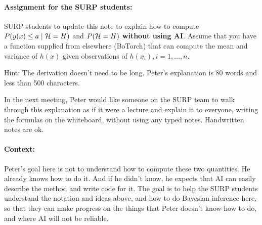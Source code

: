 \paragraph{Assignment for the SURP students:}
SURP students to update this note to explain how to compute $P(y(x) \le a \mid
\mathcal{H} = H)$ and $P(\mathcal{H} = H)$ {\bf without using AI}.  Assume that you have a
function supplied from elsewhere (BoTorch) that can compute the mean and
variance of $h(x)$ given observations of $h(x_i), i=1,\ldots,n$.

Hint: The derivation doesn't need to be long.  Peter's explanation is 80 words
and less than 500 characters.

In the next meeting, Peter would like someone on the SURP team to walk through
this explanation as if it were a lecture and explain it to everyone, writing
the formulas on the whiteboard, without using any typed notes. Handwritten
notes are ok.

\paragraph{Context:} Peter's goal here is not to understand how to compute
these two quantities. He already knows how to do it. And if he didn't know, he
expects that AI can easily describe the method and write code for it.  The goal
is to help the SURP students understand the notation and ideas above, and how
to do Bayesian inference here, so that they can make progress on the things
that Peter doesn't know how to do, and where AI will not be reliable.


